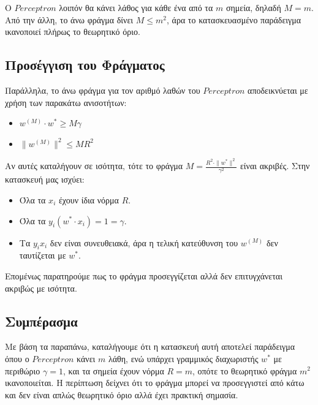 \documentclass[12pt]{article}
\begin{document}
Ο $Perceptron$ λοιπόν θα κάνει λάθος για κάθε ένα από τα $m$ σημεία, δηλαδή $M = m$. Από την άλλη, το άνω φράγμα δίνει $M \leq m^2$, άρα το κατασκευασμένο παράδειγμα ικανοποιεί πλήρως το θεωρητικό όριο.

\subsection*{Προσέγγιση του Φράγματος}

Παράλληλα, το άνω φράγμα για τον αριθμό λαθών του $Perceptron$ αποδεικνύεται με χρήση των παρακάτω ανισοτήτων:
\begin{itemize}
  \item $w^{(M)} \cdot w^* \geq M \gamma$
  \item $\|w^{(M)}\|^2 \leq M R^2$
\end{itemize}
Αν αυτές καταλήγουν σε ισότητα, τότε το φράγμα $M = \frac{R^2 \cdot \|w^*\|^2}{\gamma^2}$ είναι ακριβές. Στην κατασκευή μας ισχύει:
\begin{itemize}
  \item Όλα τα $x_i$ έχουν ίδια νόρμα $R$.
  \item Όλα τα $y_i (w^* \cdot x_i) = 1 = \gamma$.
  \item Τα $y_i x_i$ δεν είναι συνευθειακά, άρα η τελική κατεύθυνση του $w^{(M)}$ δεν ταυτίζεται με $w^*$.
\end{itemize}
Επομένως παρατηρούμε πως το φράγμα προσεγγίζεται αλλά δεν επιτυγχάνεται ακριβώς με ισότητα.

\subsection*{Συμπέρασμα}

Με βάση τα παραπάνω, καταλήγουμε ότι η κατασκευή αυτή αποτελεί παράδειγμα όπου ο $Perceptron$ κάνει $m$ λάθη, ενώ υπάρχει γραμμικός διαχωριστής $w^*$ με περιθώριο $\gamma = 1$, και τα σημεία έχουν νόρμα $R = m$, οπότε το θεωρητικό φράγμα $m^2$ ικανοποιείται. Η περίπτωση δείχνει ότι το φράγμα μπορεί να προσεγγιστεί από κάτω και δεν είναι απλώς θεωρητικό όριο αλλά έχει πρακτική σημασία.
\end{document}
